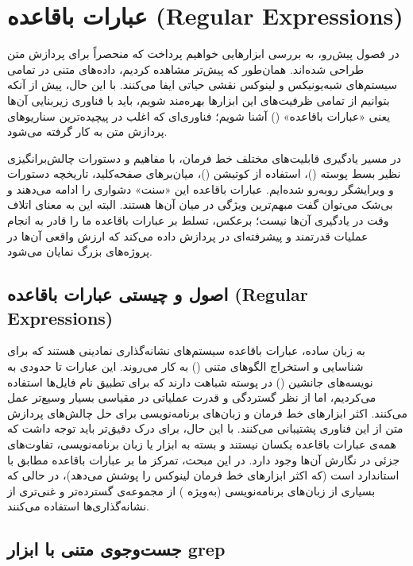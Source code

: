 \chapter{عبارات باقاعده (Regular Expressions)}

در فصول پیش‌رو، به بررسی ابزارهایی خواهیم پرداخت که منحصراً برای پردازش متن طراحی شده‌اند. همان‌طور که پیش‌تر مشاهده کردیم، داده‌های متنی در تمامی سیستم‌های شبه‌یونیکس و لینوکس نقشی حیاتی ایفا می‌کنند. با این حال، پیش از آنکه بتوانیم از تمامی ظرفیت‌های این ابزارها بهره‌مند شویم، باید با فناوری زیربنایی آن‌ها یعنی «عبارات باقاعده» () آشنا شویم؛ فناوری‌ای که اغلب در پیچیده‌ترین سناریوهای پردازش متن به کار گرفته می‌شود.

در مسیر یادگیری قابلیت‌های مختلف خط فرمان، با مفاهیم و دستورات چالش‌برانگیزی نظیر بسط پوسته ()، استفاده از کوتیشن ()، میان‌برهای صفحه‌کلید، تاریخچه دستورات و ویرایشگر  روبه‌رو شده‌ایم. عبارات باقاعده این «سنت» دشواری را ادامه می‌دهند و بی‌شک می‌توان گفت مبهم‌ترین ویژگی در میان آن‌ها هستند. البته این به معنای اتلاف وقت در یادگیری آن‌ها نیست؛ برعکس، تسلط بر عبارات باقاعده ما را قادر به انجام عملیات قدرتمند و پیشرفته‌ای در پردازش داده می‌کند که ارزش واقعی آن‌ها در پروژه‌های بزرگ نمایان می‌شود.

\section{اصول و چیستی عبارات باقاعده (Regular Expressions)}

به زبان ساده، عبارات باقاعده سیستم‌های نشانه‌گذاری نمادینی هستند که برای شناسایی و استخراج الگوهای متنی () به کار می‌روند. این عبارات تا حدودی به نویسه‌های جانشین () در پوسته شباهت دارند که برای تطبیق نام فایل‌ها استفاده می‌کردیم، اما از نظر گستردگی و قدرت عملیاتی در مقیاسی بسیار وسیع‌تر عمل می‌کنند. اکثر ابزارهای خط فرمان و زبان‌های برنامه‌نویسی برای حل چالش‌های پردازش متن از این فناوری پشتیبانی می‌کنند. با این حال، برای درک دقیق‌تر باید توجه داشت که همه‌ی عبارات باقاعده یکسان نیستند و بسته به ابزار یا زبان برنامه‌نویسی، تفاوت‌های جزئی در نگارش آن‌ها وجود دارد. در این مبحث، تمرکز ما بر عبارات باقاعده مطابق با استاندارد  است (که اکثر ابزارهای خط فرمان لینوکس را پوشش می‌دهد)، در حالی که بسیاری از زبان‌های برنامه‌نویسی (به‌ویژه ) از مجموعه‌ی گسترده‌تر و غنی‌تری از نشانه‌گذاری‌ها استفاده می‌کنند.

\section{جست‌وجوی متنی با ابزار grep}

